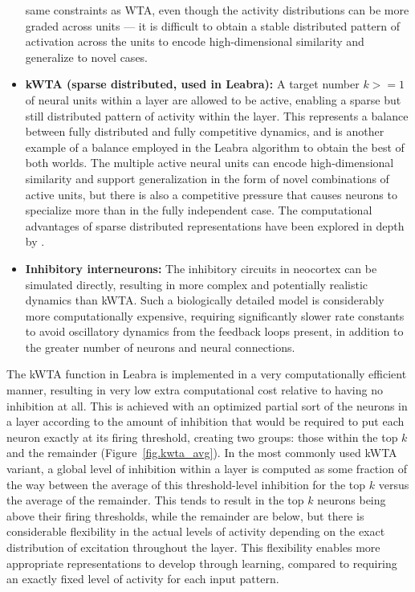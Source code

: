 \documentclass[11pt,twoside]{article}
\begin{document}
\begin{itemize}
  same constraints as WTA, even though the activity distributions can be more
  graded across units --- it is difficult to obtain a stable distributed
  pattern of activation across the units to encode high-dimensional similarity
  and generalize to novel cases.
\item {\bf kWTA (sparse distributed, used in Leabra):} A target number $k>=1$
  of neural units within a layer are allowed to be active, enabling a sparse
  but still distributed pattern of activity within the layer.  This represents
  a balance between fully distributed and fully competitive dynamics, and is
  another example of a balance employed in the Leabra algorithm to obtain the
  best of both worlds.  The multiple active neural units can encode
  high-dimensional similarity and support generalization in the form of novel
  combinations of active units, but there is also a competitive pressure that
  causes neurons to specialize more than in the fully independent case.  The
  computational advantages of sparse distributed representations have been
  explored in depth by .
\item {\bf Inhibitory interneurons:} The inhibitory circuits in neocortex can
  be simulated directly, resulting in more complex and potentially realistic
  dynamics than kWTA.  Such a biologically detailed model is considerably more
  computationally expensive, requiring significantly slower rate constants to
  avoid oscillatory dynamics from the feedback loops present, in addition to
  the greater number of neurons and neural connections.
\end{itemize}

The kWTA function in Leabra is implemented in a very computationally efficient
manner, resulting in very low extra computational cost relative to having no
inhibition at all.  This is achieved with an optimized partial sort of the
neurons in a layer according to the amount of inhibition that would be
required to put each neuron exactly at its firing threshold, creating two
groups: those within the top $k$ and the remainder
(Figure~\ref{fig.kwta_avg}).  In the most commonly used kWTA variant, a global
level of inhibition within a layer is computed as some fraction of the way
between the average of this threshold-level inhibition for the top $k$ versus
the average of the remainder.  This tends to result in the top $k$ neurons
being above their firing thresholds, while the remainder are below, but there
is considerable flexibility in the actual levels of activity depending on the
exact distribution of excitation throughout the layer.  This flexibility
enables more appropriate representations to develop through learning, compared
to requiring an exactly fixed level of activity for each input pattern.
\end{document}
